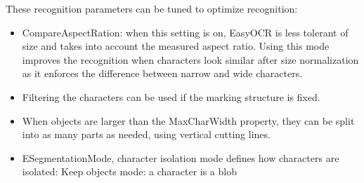 These recognition parameters can be tuned to optimize recognition:
\begin{itemize}
	\item CompareAspectRation: when this setting is on, EasyOCR is less tolerant of size and takes into account the measured aspect ratio. Using this mode improves the recognition when characters look similar after size normalization as it enforces the difference between narrow and wide characters.
	\item Filtering the characters can be used if the marking structure is fixed.
	\item When objects are larger than the MaxCharWidth property, they can be split into as many parts as needed, using vertical cutting lines.
	\item ESegmentationMode, character isolation mode defines how characters are isolated:
	Keep objects mode: a character is a blob 
\end{itemize}



















